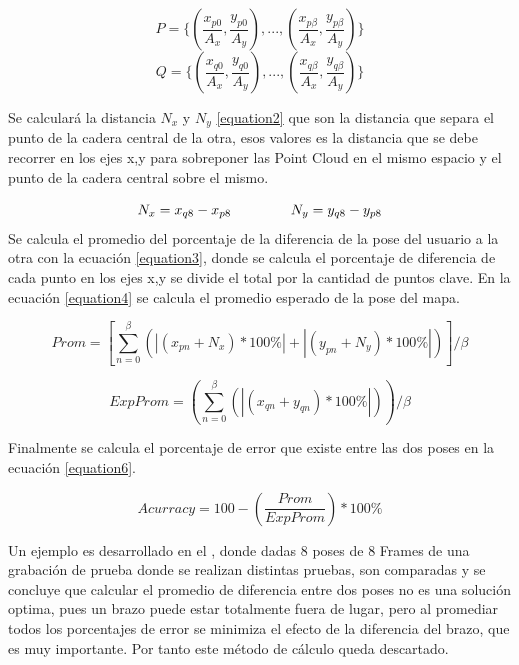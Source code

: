 \begin{equation}
P=\{(\frac{x_{p0}}{A_x},\frac{y_{p0}}{A_y}),...,(\frac{x_{p\beta}}{A_x},\frac{y_{p\beta}}{A_y})\}
\label{equation1.1}
\end{equation}
\begin{equation}
Q=\{(\frac{x_{q0}}{A_x},\frac{y_{q0}}{A_y}),...,(\frac{x_{q\beta}}{A_x},\frac{y_{q\beta}}{A_y})\}
\label{equation1.2}
\end{equation}

Se calculará la distancia $N_x$ y $N_y$ \ref{equation2} que son la distancia que separa el punto de la cadera central de la otra, esos valores es la distancia que se debe recorrer en los ejes x,y para sobreponer las Point Cloud en el mismo espacio y el punto de la cadera central sobre el mismo.

\begin{equation}
N_x= x_{q8}-x_{p8} \hspace{15mm} N_y= y_{q8}-y_{p8}
\label{equation2}
\end{equation}
Se calcula el promedio del porcentaje de la diferencia de la pose del usuario a la otra con la ecuación \ref{equation3}, donde se calcula el porcentaje de diferencia de cada punto en los ejes x,y se divide el total por la cantidad de puntos clave. En la ecuación \ref{equation4} se calcula el promedio esperado de la pose del mapa.

\begin{equation}
Prom = [\sum_{n=0}^\beta (\left | (x_{pn}+N_x)*100\% \right |  +  \left |  (y_{pn}+N_y)*100\%  \right |) ]/\beta
\label{equation3}
\end{equation}

\begin{equation}
ExpProm = (\sum_{n=0}^\beta (\left | (x_{qn}+y_{qn})*100\% \right |))/\beta
\label{equation4}
\end{equation}

Finalmente se calcula el porcentaje de error que existe entre las dos poses en la ecuación \ref{equation6}. 

\begin{equation}
Acurracy = 100 - (\frac{Prom}{ExpProm})*100 \%
\label{equation6}
\end{equation}



Un ejemplo es desarrollado en el , donde dadas 8 poses de 8 Frames de una grabación de prueba donde se realizan distintas pruebas, son comparadas y se concluye que calcular el promedio de diferencia entre dos poses no es una solución optima, pues un brazo puede estar totalmente fuera de lugar, pero al promediar todos los porcentajes de error se minimiza el efecto de la diferencia del brazo, que es muy importante. Por tanto este método de cálculo queda descartado.


